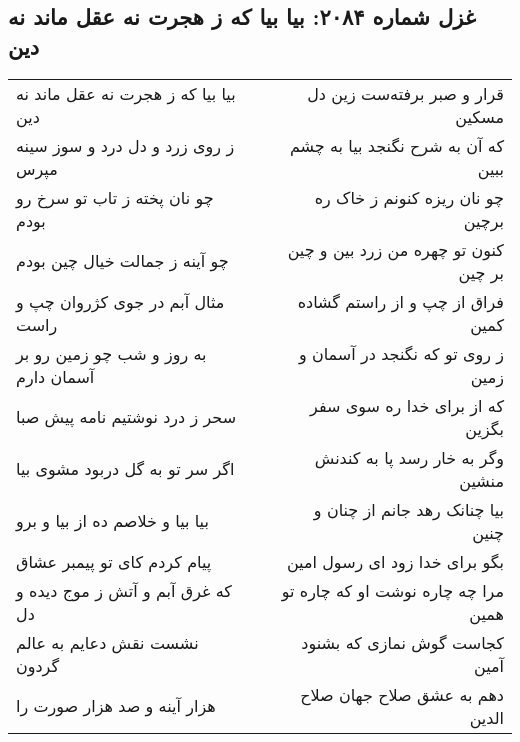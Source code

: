 \begin{center}
\section*{غزل شماره ۲۰۸۴: بیا بیا که ز هجرت نه عقل ماند نه دین}
\label{sec:2084}
\begin{longtable}{l p{0.5cm} r}
بیا بیا که ز هجرت نه عقل ماند نه دین
&&
قرار و صبر برفته‌ست زین دل مسکین
\\
ز روی زرد و دل درد و سوز سینه مپرس
&&
که آن به شرح نگنجد بیا به چشم ببین
\\
چو نان پخته ز تاب تو سرخ رو بودم
&&
چو نان ریزه کنونم ز خاک ره برچین
\\
چو آینه ز جمالت خیال چین بودم
&&
کنون تو چهره من زرد بین و چین بر چین
\\
مثال آبم در جوی کژروان چپ و راست
&&
فراق از چپ و از راستم گشاده کمین
\\
به روز و شب چو زمین رو بر آسمان دارم
&&
ز روی تو که نگنجد در آسمان و زمین
\\
سحر ز درد نوشتیم نامه پیش صبا
&&
که از برای خدا ره سوی سفر بگزین
\\
اگر سر تو به گل دربود مشوی بیا
&&
وگر به خار رسد پا به کندنش منشین
\\
بیا بیا و خلاصم ده از بیا و برو
&&
بیا چنانک رهد جانم از چنان و چنین
\\
پیام کردم کای تو پیمبر عشاق
&&
بگو برای خدا زود ای رسول امین
\\
که غرق آبم و آتش ز موج دیده و دل
&&
مرا چه چاره نوشت او که چاره تو همین
\\
نشست نقش دعایم به عالم گردون
&&
کجاست گوش نمازی که بشنود آمین
\\
هزار آینه و صد هزار صورت را
&&
دهم به عشق صلاح جهان صلاح الدین
\\
\end{longtable}
\end{center}
